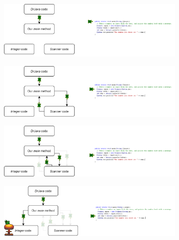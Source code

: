 \begin{figure}[h!]
\begin{subfigure}{1\textwidth}
  \centering
  \includegraphics[width=1\textwidth]{lectures/images/code_turtle_1.png}
  \caption{}
  \label{fig:sturtle1}
\end{subfigure}%

\begin{subfigure}{1\textwidth}
  \centering
  \includegraphics[width=1\textwidth]{lectures/images/code_turtle_2.png}
  \caption{}
  \label{fig:sturtle2}
\end{subfigure}%

\begin{subfigure}{1.\textwidth}
  \centering
  \includegraphics[width=1\textwidth]{lectures/images/code_turtle_3.png}
  \caption{}
  \label{fig:sturtle3}
\end{subfigure}%

\begin{subfigure}{1.\textwidth}
  \centering
  \includegraphics[width=1\textwidth]{lectures/images/code_turtle_4.png}
  \caption{}
  \label{fig:sturtle4}
\end{subfigure}%


\end{figure}
